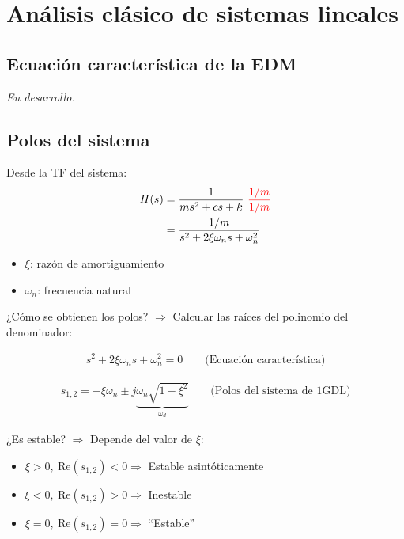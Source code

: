 \chapter{Análisis clásico de sistemas lineales}

\section{Ecuación característica de la EDM}

\emph{En desarrollo.}

\section{Polos del sistema}

Desde la TF del sistema:
\begin{align*}
    H(s) &= \frac{1}{ms^2+cs+k} ~\color{red}{\frac{1/m}{1/m}}\\
    &= \frac{1/m}{s^2+2\xi\omega_ns+\omega_n^2}
\end{align*}
\begin{itemize}
    \item $\xi$: razón de amortiguamiento
    \item $\omega_n$: frecuencia natural
\end{itemize}

¿Cómo se obtienen los polos? $\Longrightarrow$ Calcular las raíces del polinomio del denominador:

\begin{align*}
    s^2+2\xi\omega_ns+\omega_n^2=0 \qquad\text{(Ecuaci\'on caracter\'istica)}
\end{align*}

\begin{align*}
     s_{1,2}=-\xi\omega_n\pm j \underbrace{\omega_n\sqrt{1-\xi^2}}_{\omega_d} \qquad \text{(Polos del sistema de 1GDL)}
\end{align*}

¿Es estable? $\Longrightarrow$ Depende del valor de $\xi$:
\begin{itemize}
    \item $\xi>0, ~ \text{Re}(s_{1,2})<0\Longrightarrow$ Estable asintóticamente
    \item $\xi<0, ~ \text{Re}(s_{1,2})>0\Longrightarrow$ Inestable
    \item $\xi=0, ~ \text{Re}(s_{1,2})=0\Longrightarrow$ ``Estable''
\end{itemize}

